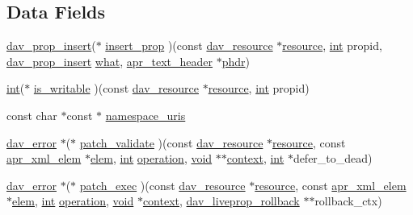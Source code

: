 \subsection*{Data Fields}
\begin{DoxyCompactItemize}
\item 
\hyperlink{group__MOD__DAV_ga4c0cd73bce52d0eda981ce54973f27af}{dav\+\_\+prop\+\_\+insert}($\ast$ \hyperlink{structdav__hooks__liveprop_ab141270827afd7235865bc6fd9fe1b9f}{insert\+\_\+prop} )(const \hyperlink{structdav__resource}{dav\+\_\+resource} $\ast$\hyperlink{group__APR__Util__RL_gaa6244aacafcc4ec1d0727bdb32614b11}{resource}, \hyperlink{pcre_8txt_a42dfa4ff673c82d8efe7144098fbc198}{int} propid, \hyperlink{group__MOD__DAV_ga4c0cd73bce52d0eda981ce54973f27af}{dav\+\_\+prop\+\_\+insert} \hyperlink{group__apr__thread__proc_gaf132f350c1657f61f533df7066e903c4}{what}, \hyperlink{structapr__text__header}{apr\+\_\+text\+\_\+header} $\ast$\hyperlink{group__MOD__DAV_ga08f35dafe4ef680fc79b6e69d71c8f90}{phdr})
\item 
\hyperlink{pcre_8txt_a42dfa4ff673c82d8efe7144098fbc198}{int}($\ast$ \hyperlink{structdav__hooks__liveprop_a0d480e2040b1df37742cfe0db87df757}{is\+\_\+writable} )(const \hyperlink{structdav__resource}{dav\+\_\+resource} $\ast$\hyperlink{group__APR__Util__RL_gaa6244aacafcc4ec1d0727bdb32614b11}{resource}, \hyperlink{pcre_8txt_a42dfa4ff673c82d8efe7144098fbc198}{int} propid)
\item 
const char $\ast$const $\ast$ \hyperlink{structdav__hooks__liveprop_a7f85e5fc26d7c02d682e80c1e0ccf473}{namespace\+\_\+uris}
\item 
\hyperlink{structdav__error}{dav\+\_\+error} $\ast$($\ast$ \hyperlink{structdav__hooks__liveprop_a6c48781258f45a6fa4b3548c56557916}{patch\+\_\+validate} )(const \hyperlink{structdav__resource}{dav\+\_\+resource} $\ast$\hyperlink{group__APR__Util__RL_gaa6244aacafcc4ec1d0727bdb32614b11}{resource}, const \hyperlink{structapr__xml__elem}{apr\+\_\+xml\+\_\+elem} $\ast$\hyperlink{structelem}{elem}, \hyperlink{pcre_8txt_a42dfa4ff673c82d8efe7144098fbc198}{int} \hyperlink{pcre_8txt_a8ff5f82298de6a0da90f12e91c06f728}{operation}, \hyperlink{group__MOD__ISAPI_gacd6cdbf73df3d9eed42fa493d9b621a6}{void} $\ast$$\ast$\hyperlink{pcregrep_8txt_a651ed26971b1d49911883c4eb87db1ad}{context}, \hyperlink{pcre_8txt_a42dfa4ff673c82d8efe7144098fbc198}{int} $\ast$defer\+\_\+to\+\_\+dead)
\item 
\hyperlink{structdav__error}{dav\+\_\+error} $\ast$($\ast$ \hyperlink{structdav__hooks__liveprop_a8a61b9620f8de09675b2ea148661be77}{patch\+\_\+exec} )(const \hyperlink{structdav__resource}{dav\+\_\+resource} $\ast$\hyperlink{group__APR__Util__RL_gaa6244aacafcc4ec1d0727bdb32614b11}{resource}, const \hyperlink{structapr__xml__elem}{apr\+\_\+xml\+\_\+elem} $\ast$\hyperlink{structelem}{elem}, \hyperlink{pcre_8txt_a42dfa4ff673c82d8efe7144098fbc198}{int} \hyperlink{pcre_8txt_a8ff5f82298de6a0da90f12e91c06f728}{operation}, \hyperlink{group__MOD__ISAPI_gacd6cdbf73df3d9eed42fa493d9b621a6}{void} $\ast$\hyperlink{pcregrep_8txt_a651ed26971b1d49911883c4eb87db1ad}{context}, \hyperlink{group__MOD__DAV_gafa19778d61300befd3b972a18cd564d5}{dav\+\_\+liveprop\+\_\+rollback} $\ast$$\ast$rollback\+\_\+ctx)

\end{DoxyCompactItemize}
